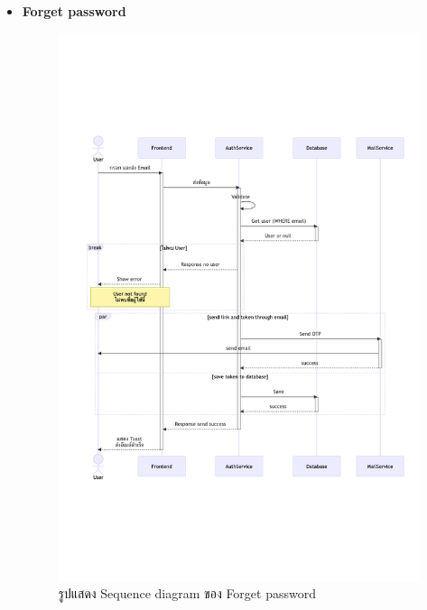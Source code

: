 \documentclass[12pt,oneside,openright,a4paper]{cpe-thai-project}
\begin{document}
\begin{itemize}
    \newpage
    \item \textbf{Forget password} \\
    \begin{figure}[!ht]\centering
        \includegraphics[width=13cm, trim={0 7cm 0 7cm},clip]{./assets/sequence-diagram/forget-password.png}
        \caption{รูปแสดง Sequence diagram ของ Forget password}\label{fig:sqForgetPassword}
    \end{figure}


\end{itemize}
\end{document}
